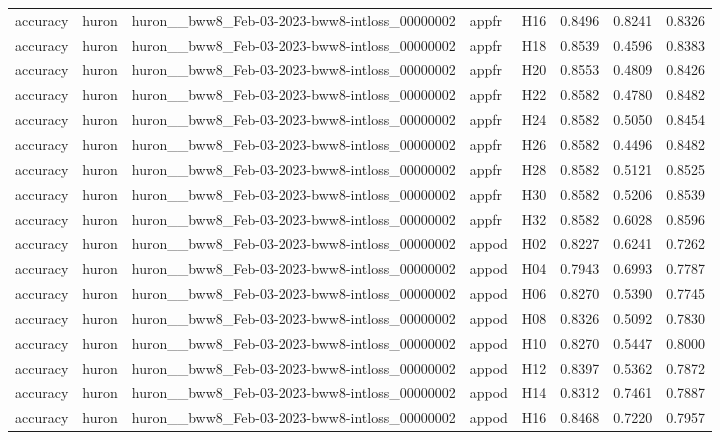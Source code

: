 \begin{table}[tbp]
\begin{tabular}{lllllrrr}
accuracy & huron & huron\_\_bww8\_Feb-03-2023-bww8-intloss\_00000002 & appfr & H16 & 0.8496 & 0.8241 & 0.8326 \\
accuracy & huron & huron\_\_bww8\_Feb-03-2023-bww8-intloss\_00000002 & appfr & H18 & 0.8539 & 0.4596 & 0.8383 \\
accuracy & huron & huron\_\_bww8\_Feb-03-2023-bww8-intloss\_00000002 & appfr & H20 & 0.8553 & 0.4809 & 0.8426 \\
accuracy & huron & huron\_\_bww8\_Feb-03-2023-bww8-intloss\_00000002 & appfr & H22 & 0.8582 & 0.4780 & 0.8482 \\
accuracy & huron & huron\_\_bww8\_Feb-03-2023-bww8-intloss\_00000002 & appfr & H24 & 0.8582 & 0.5050 & 0.8454 \\
accuracy & huron & huron\_\_bww8\_Feb-03-2023-bww8-intloss\_00000002 & appfr & H26 & 0.8582 & 0.4496 & 0.8482 \\
accuracy & huron & huron\_\_bww8\_Feb-03-2023-bww8-intloss\_00000002 & appfr & H28 & 0.8582 & 0.5121 & 0.8525 \\
accuracy & huron & huron\_\_bww8\_Feb-03-2023-bww8-intloss\_00000002 & appfr & H30 & 0.8582 & 0.5206 & 0.8539 \\
accuracy & huron & huron\_\_bww8\_Feb-03-2023-bww8-intloss\_00000002 & appfr & H32 & 0.8582 & 0.6028 & 0.8596 \\
accuracy & huron & huron\_\_bww8\_Feb-03-2023-bww8-intloss\_00000002 & appod & H02 & 0.8227 & 0.6241 & 0.7262 \\
accuracy & huron & huron\_\_bww8\_Feb-03-2023-bww8-intloss\_00000002 & appod & H04 & 0.7943 & 0.6993 & 0.7787 \\
accuracy & huron & huron\_\_bww8\_Feb-03-2023-bww8-intloss\_00000002 & appod & H06 & 0.8270 & 0.5390 & 0.7745 \\
accuracy & huron & huron\_\_bww8\_Feb-03-2023-bww8-intloss\_00000002 & appod & H08 & 0.8326 & 0.5092 & 0.7830 \\
accuracy & huron & huron\_\_bww8\_Feb-03-2023-bww8-intloss\_00000002 & appod & H10 & 0.8270 & 0.5447 & 0.8000 \\
accuracy & huron & huron\_\_bww8\_Feb-03-2023-bww8-intloss\_00000002 & appod & H12 & 0.8397 & 0.5362 & 0.7872 \\
accuracy & huron & huron\_\_bww8\_Feb-03-2023-bww8-intloss\_00000002 & appod & H14 & 0.8312 & 0.7461 & 0.7887 \\
accuracy & huron & huron\_\_bww8\_Feb-03-2023-bww8-intloss\_00000002 & appod & H16 & 0.8468 & 0.7220 & 0.7957 \\

\end{tabular}
\end{table}
